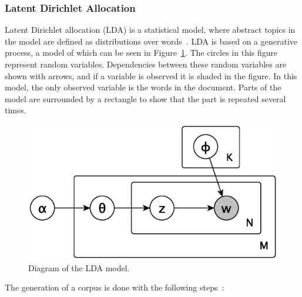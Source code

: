 \subsubsection{Latent Dirichlet Allocation}

Latent Dirichlet allocation (LDA) is a statistical model, where abstract topics in the model are defined as distributions over words~\cite{blei2003latent}.
LDA is based on a generative process, a model of which can be seen in Figure~\ref{fig:lda_gen_process}.
The circles in this figure represent random variables.
Dependencies between these random variables are shown with arrows, and if a variable is observed it is shaded in the figure.
In this model, the only observed variable is the words in the document.
Parts of the model are surrounded by a rectangle to show that the part is repeated several times.

\begin{figure}
\includegraphics[scale=0.7]{figures/lda-generative-process.eps}
\caption{Diagram of the LDA model.}\label{fig:lda_gen_process}
\end{figure}

The generation of a corpus is done with the following steps~\cite{crain2012dimensionality, blei2003latent}:

